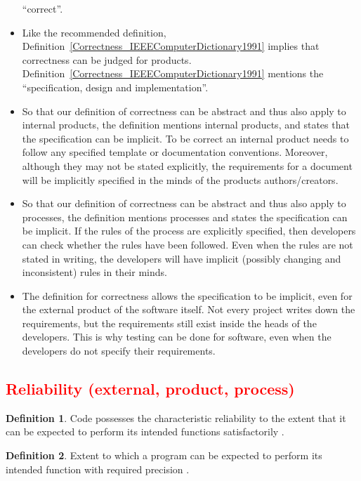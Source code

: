 \documentclass[letterpaper, cleveref]{lipics-v2019}
\newcommand{\authornote}[3]{\textcolor{#1}{[#3 ---#2]}}
\newcommand{\authornote}[3]{}
\newcommand{\oo}[1]{\authornote{magenta}{OO}{#1}} %
\newcommand{\notdone}[1]{\textcolor{red}{#1}}
\theoremstyle{definition}
\newtheorem{defn}{Definition}
\begin{document}
\begin{itemize}
  ``correct''.
  \item Like the recommended definition,
  Definition~\ref{Correctness_IEEEComputerDictionary1991} implies that
  correctness can be judged for products.
  Definition~\ref{Correctness_IEEEComputerDictionary1991} mentions the
  ``specification, design and implementation''.
  \item So that our definition of correctness can be abstract and thus also
  apply to internal products, the definition mentions internal products, and
  states that the specification can be implicit.  To be correct an internal
  product needs to follow any specified template or documentation conventions.
  Moreover, although they may not be stated explicitly, the requirements for a
  document will be implicitly specified in the minds of the products
  authors/creators.
  \item So that our definition of correctness can be abstract and thus also
  apply to processes, the definition mentions processes and states the
  specification can be implicit.  If the rules of the process are explicitly
  specified, then developers can check whether the rules have been followed.
  Even when the rules are not stated in writing, the developers will have
  implicit (possibly changing and inconsistent) rules in their minds.
  \item The definition for correctness allows the specification to be implicit,
  even for the external product of the software itself.  Not every project
  writes down the requirements, but the requirements still exist inside the
  heads of the developers.  This is why testing can be done for software, even
  when the developers do not specify their requirements.
\end{itemize}


\subsection{\notdone{Reliability (external, product, process)}} %

\begin{defn}
  Code possesses the characteristic reliability to the extent that it can be
  expected to perform its intended functions satisfactorily
  \citep{boehm1976quantitative}.
\end{defn}

\begin{defn}
  Extent to which a program can be expected to perform its intended function
  with required precision \citep{McCallEtAl1977}.
\end{defn}
\end{document}
